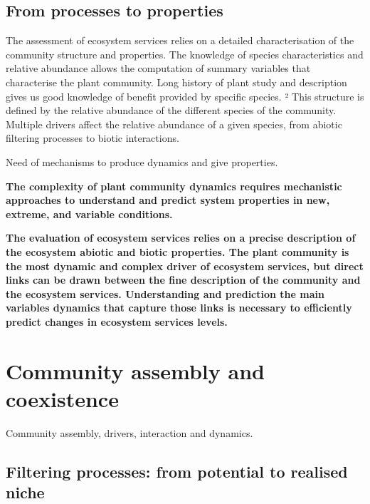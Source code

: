 \subsection{From processes to properties}

The assessment of ecosystem services relies on a detailed characterisation of the community structure and properties. The knowledge of species characteristics and relative abundance allows the computation of summary variables that characterise the plant community. Long history of plant study and description gives us good knowledge of benefit provided by specific species. 
²
This structure is defined by the relative abundance of the different species of the community. Multiple drivers affect the relative abundance of a given species, from abiotic filtering processes to biotic interactions. 

Need of mechanisms to produce dynamics and give properties.

\textbf{The complexity of plant community dynamics requires mechanistic approaches to understand and predict system properties in new, extreme, and variable conditions. }


\textbf{The evaluation of ecosystem services relies on a precise description of the ecosystem abiotic and biotic properties. The plant community is the most dynamic and complex driver of ecosystem services, but direct links can be drawn between the fine description of the community and the ecosystem services. Understanding and prediction the main variables dynamics that capture those links is necessary to efficiently predict changes in ecosystem services levels.}

\section{Community assembly and coexistence}

Community assembly, drivers, interaction and dynamics.


\subsection{Filtering processes: from potential to realised niche}



